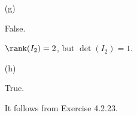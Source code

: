 \begin{Exercise}
\begin{enumerate}[(a)]
\item[(g)]
\begin{answer}
False.
\end{answer}
\begin{solution}
$\rank(I_2) = 2$, but $\det(I_2) = 1$.
\end{solution}

\item[(h)]
\begin{answer}
True.
\end{answer}
\begin{solution}
It follows from Exercise 4.2.23.
\end{solution}

\end{enumerate}
\end{Exercise}